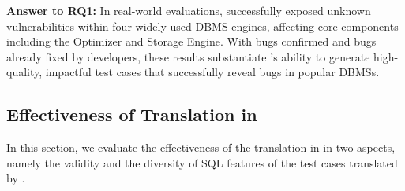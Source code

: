 \documentclass[sigconf,review,anonymous]{acmart}
\begin{document}








\begin{answerbox}
\textbf{Answer to RQ1:} 
In real-world evaluations, \tool{} successfully exposed \bugcnt{} unknown vulnerabilities within four widely used DBMS engines, affecting core components including the Optimizer and Storage Engine.
With \bugconfirmcnt{} bugs confirmed and \bugfixcnt{} bugs already fixed by developers, these results substantiate \tool{}’s ability to generate high-quality, impactful test cases that successfully reveal bugs in popular DBMSs.
\end{answerbox}

\subsection{Effectiveness of Translation in \tool{}}
In this section, we evaluate the effectiveness of the translation in \tool{} in two aspects, namely the validity and the diversity of SQL features of the test cases translated by \tool{}.
\end{document}
